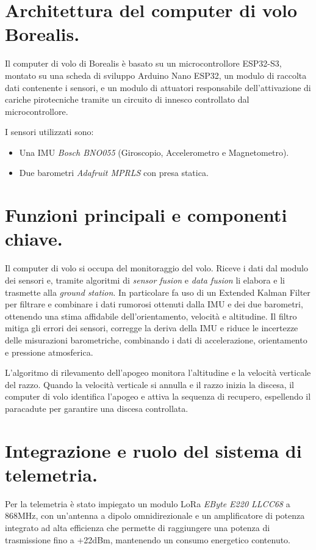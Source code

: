 \documentclass[12pt,a4paper,twoside]{book}
\begin{document}
\section{Architettura del computer di volo Borealis.}
Il computer di volo di Borealis è basato su un microcontrollore ESP32-S3, montato
su una scheda di sviluppo Arduino Nano ESP32, un modulo di raccolta dati contenente
i sensori, e un modulo di attuatori responsabile dell'attivazione di cariche 
pirotecniche tramite un circuito di innesco controllato dal microcontrollore.

I sensori utilizzati sono:
\begin{itemize}
    \item Una \ac{IMU} \emph{Bosch BNO055} (Giroscopio, Accelerometro e Magnetometro).
    \item Due barometri \emph{Adafruit MPRLS} con presa statica.
\end{itemize}

\section{Funzioni principali e componenti chiave.}
Il computer di volo si occupa del monitoraggio del volo. Riceve i dati dal modulo
dei sensori e, tramite algoritmi di \emph{sensor fusion} e \emph{data fusion} 
li elabora e li trasmette alla \emph{ground station}.
In particolare fa uso di un Extended Kalman Filter per filtrare e combinare i 
dati rumorosi ottenuti dalla \ac{IMU} e dei due barometri, ottenendo una stima 
affidabile dell'orientamento, velocità e altitudine.
Il filtro mitiga gli errori dei sensori, corregge la deriva della IMU e riduce 
le incertezze delle misurazioni barometriche, combinando i dati di accelerazione, 
orientamento e pressione atmosferica.

L'algoritmo di rilevamento dell'apogeo monitora l'altitudine e la velocità verticale
del razzo. 
Quando la velocità verticale si annulla e il razzo inizia la discesa,  il 
computer di volo identifica l'apogeo e attiva la sequenza di recupero, 
espellendo il paracadute per garantire una discesa controllata.

\section{Integrazione e ruolo del sistema di telemetria.}
Per la telemetria è stato impiegato un modulo \ac{LoRa} \emph{EByte E220 LLCC68}
a 868MHz, con un'antenna a dipolo omnidirezionale e un amplificatore di potenza 
integrato ad alta efficienza che permette di raggiungere una potenza di 
trasmissione fino a +22dBm, mantenendo un consumo energetico contenuto.
\end{document}
